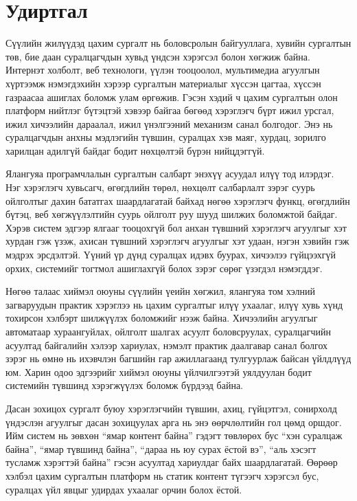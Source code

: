 
{}
\label{Introduction}

\section*{Удиртгал}
Сүүлийн жилүүдэд цахим сургалт нь боловсролын байгууллага, хувийн сургалтын төв, бие даан суралцагчдын хувьд үндсэн хэрэгсэл болон хөгжиж байна. Интернэт холболт, веб технологи, үүлэн тооцоолол, мультимедиа агуулгын хүртээмж нэмэгдэхийн хэрээр сургалтын материалыг хүссэн цагтаа, хүссэн газраасаа ашиглах боломж улам өргөжив. Гэсэн хэдий ч цахим сургалтын олон платформ нийтлэг бүтэцтэй хэвээр байгаа бөгөөд хэрэглэгч бүрт ижил урсгал, ижил хичээлийн дараалал, ижил үнэлгээний механизм санал болгодог. Энэ нь суралцагчдын анхны мэдлэгийн түвшин, суралцах хэв маяг, хурдац, зорилго харилцан адилгүй байдаг бодит нөхцөлтэй бүрэн нийцдэггүй.

Ялангуяа програмчлалын сургалтын салбарт энэхүү асуудал илүү тод илэрдэг. Нэг хэрэглэгч хувьсагч, өгөгдлийн төрөл, нөхцөлт салбарлалт зэрэг суурь ойлголтыг дахин бататгах шаардлагатай байхад нөгөө хэрэглэгч функц, өгөгдлийн бүтэц, веб хөгжүүлэлтийн суурь ойлголт руу шууд шилжих боломжтой байдаг. Хэрэв систем эдгээр ялгааг тооцохгүй бол анхан түвшний хэрэглэгч агуулгыг хэт хурдан гэж үзэж, ахисан түвшний хэрэглэгч агуулгыг хэт удаан, нэгэн хэвийн гэж мэдрэх эрсдэлтэй. Үүний үр дүнд суралцах идэвх буурах, хичээлээ гүйцээхгүй орхих, системийг тогтмол ашиглахгүй болох зэрэг сөрөг үзэгдэл нэмэгддэг.

Нөгөө талаас хиймэл оюуны сүүлийн үеийн хөгжил, ялангуяа том хэлний загваруудын практик хэрэглээ нь цахим сургалтыг илүү ухаалаг, илүү хувь хүнд тохирсон хэлбэрт шилжүүлэх боломжийг нээж байна. Хичээлийн агуулгыг автоматаар хураангуйлах, ойлголт шалгах асуулт боловсруулах, суралцагчийн асуултад байгалийн хэлээр хариулах, нэмэлт практик даалгавар санал болгох зэрэг нь өмнө нь ихэвчлэн багшийн гар ажиллагаанд тулгуурлаж байсан үйлдлүүд юм. Харин одоо эдгээрийг хиймэл оюуны үйлчилгээтэй уялдуулан бодит системийн түвшинд хэрэгжүүлэх боломж бүрдээд байна.

Дасан зохицох сургалт буюу хэрэглэгчийн түвшин, ахиц, гүйцэтгэл, сонирхолд үндэслэн агуулгыг дасан зохицуулах арга нь энэ өөрчлөлтийн гол цөмд оршдог. Ийм систем нь зөвхөн ``ямар контент байна'' гэдэгт төвлөрөх бус ``хэн суралцаж байна'', ``ямар түвшинд байна'', ``дараа нь юу сурах ёстой вэ'', ``аль хэсэгт тусламж хэрэгтэй байна'' гэсэн асуултад хариулдаг байх шаардлагатай. Өөрөөр хэлбэл цахим сургалтын платформ нь статик контент түгээгч хэрэгсэл бус, суралцах үйл явцыг удирдах ухаалаг орчин болох ёстой.

